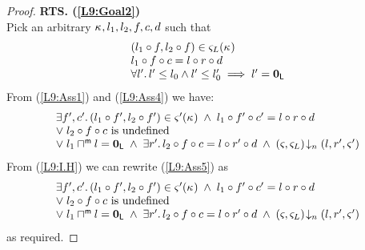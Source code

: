 \begin{lemma}[]
\begin{proof}
\noindent\textbf{RTS. (\ref{L9:Goal2})}\\
Pick an arbitrary $\kappa_{}, l_1, l_2, f, c, d$ such that
%
\begin{align}
	\begin{array}{l}
		(l_1 \circ f, l_2 \circ f) \in \varsigma_{L}(\kappa_{})\\
  	l_1 \circ f \circ c = l \circ r \circ d\\
  	\forall l'.\, l' \leq l_0 \land l' \leq l'_0 \implies l' = \mathbf{0}_{\textsf{L}}
	\end{array} \label{L9:Ass4}
\end{align}
%
From (\ref{L9:Ass1}) and (\ref{L9:Ass4}) we have:
%
\begin{align}
  \begin{array}{l}
  	\exists f', c'.\, (l_1 \circ f', l_2 \circ f') \in \varsigma_{}'(\kappa_{}) \;\land\; l_1 \circ f' \circ c' =  l \circ r \circ d\\
		\lor\;l_2 \circ f \circ c \text{ is undefined}\\
		\lor\; l_1 \sqcap_{}^{\textsf{m}} l = \mathbf{0}_{\textsf{L}} \;\land\; \exists r'.\, l_2 \circ f \circ c = l \circ r' \circ d \;\land\; \left(\varsigma_{}, \varsigma_{L}\right) \!\downarrow_{n} \left(l, r', \varsigma_{}'\right)
  \end{array}\label{L9:Ass5}
\end{align}
%
From (\ref{L9:I.H}) we can rewrite (\ref{L9:Ass5}) as
%
\begin{align}
	\begin{array}{l}
  	\exists f', c'.\, (l_1 \circ f', l_2 \circ f') \in \varsigma_{}'(\kappa_{}) \;\land\; l_1 \circ f' \circ c' =  l \circ r \circ d\\
		\lor\;l_2 \circ f \circ c \text{ is undefined}\\
		\lor\; l_1 \sqcap_{}^{\textsf{m}} l = \mathbf{0}_{\textsf{L}} \;\land\; \exists r'.\, l_2 \circ f \circ c = l \circ r' \circ d \;\land\; \left(\varsigma_{}, \varsigma_{L}\right) \!\downarrow_{n} \left(l, r', \varsigma_{}'\right)
  \end{array} \nonumber
\end{align}
%
as required.
\end{proof}
\end{lemma}
%
%
%


